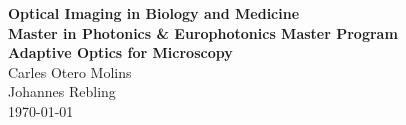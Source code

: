 \documentclass[
a4paper,        			%
DIV=12,
11pt,						%
BCOR=10mm,					%
oneside,					%
headings = normal,			%
listof=totoc,				%
bibliography=totoc,			%
]
{scrartcl}
\begin{document}
\begin{center}
\Large
\textbf{Optical Imaging in Biology and Medicine\\
Master in Photonics \& Europhotonics Master Program\\
\vspace{1em}
\huge 
Adaptive Optics for Microscopy}\\
\vspace{2em}
\Large
Carles Otero Molins\\
Johannes Rebling\\
\vspace{.2em}
\today
\end{center}

\pagestyle{empty}




\tableofcontents
\clearpage

\pagestyle{fancy}      %
\setcounter{page}{1}






\clearpage


\clearpage

%
\end{document}
